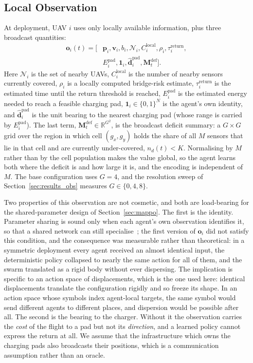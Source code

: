 \documentclass[conference]{IEEEtran}
\begin{document}
\subsection{Local Observation}
At deployment, UAV $i$ uses only locally available information, plus three
broadcast quantities:
\begin{equation}
\begin{split}
\mathbf o_i(t)=\bigl[&\mathbf p_i,\mathbf v_i,b_i,\mathcal N_i,C_i^{\mathrm{local}},\rho_i,\tau_i^{\mathrm{return}},\\
&E_i^{\mathrm{pad}},\mathbf 1_i,\hat{\mathbf d}_i^{\mathrm{pad}},\mathbf M_t^{\mathrm{def}}\bigr].
\end{split}
\label{eq:obs}
\end{equation}
Here $\mathcal N_i$ is the set of nearby UAVs, $C_i^{\mathrm{local}}$ is the number of nearby sensors currently covered, $\rho_i$ is a locally computed bridge-risk estimate, $\tau_i^{\mathrm{return}}$ is the estimated time until the return threshold is reached, $E_i^{\mathrm{pad}}$ is the estimated energy needed to reach a feasible charging pad, $\mathbf 1_i\in\{0,1\}^{N}$ is the agent's own identity, and $\hat{\mathbf d}_i^{\mathrm{pad}}$ is the unit bearing to the nearest charging pad (whose range is carried by $E_i^{\mathrm{pad}}$). The last term, $\mathbf M_t^{\mathrm{def}}\in\mathbb R^{G^2}$, is the broadcast deficit summary: a $G\times G$ grid over the region in which cell $(g_x,g_y)$ holds the share of all $M$ sensors that lie in that cell and are currently under-covered, $n_d(t)<K$. Normalising by $M$ rather than by the cell population makes the value global, so the agent learns both where the deficit is and how large it is, and the encoding is independent of $M$. The base configuration uses $G=4$, and the resolution sweep of Section~\ref{sec:results_obs} measures $G\in\{0,4,8\}$.

Two properties of this observation are not cosmetic, and both are load-bearing for the shared-parameter design of Section~\ref{sec:mappo}. The first is the identity. Parameter sharing is sound only when each agent's own observation identifies it, so that a shared network can still specialise~\cite{foerster2016}; the first version of $\mathbf o_i$ did not satisfy this condition, and the consequence was measurable rather than theoretical: in a symmetric deployment every agent received an almost identical input, the deterministic policy collapsed to nearly the same action for all of them, and the swarm translated as a rigid body without ever dispersing. The implication is specific to an action space of displacements, which is the one used here: identical displacements translate the configuration rigidly and so freeze its shape. In an action space whose symbols index agent-local targets, the same symbol would send different agents to different places, and dispersion would be possible after all. The second is the bearing to the charger. Without it the observation carries the \emph{cost} of the flight to a pad but not its \emph{direction}, and a learned policy cannot express the return at all. We assume that the infrastructure which owns the charging pads also broadcasts their positions, which is a communication assumption rather than an oracle.
\end{document}
